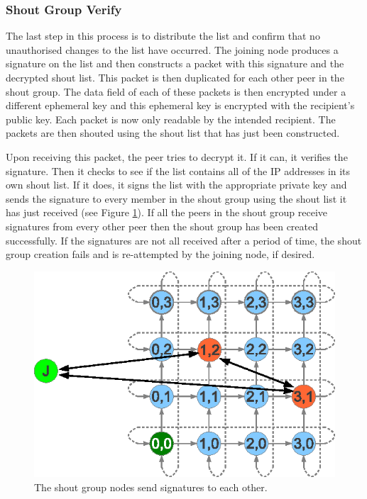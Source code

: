 \documentclass[ %
                    author={Luke Murray},
                supervisor={Dr. Simon Hollis},
                     title={Shadow Peer-to-Peer Networks},
                  subtitle={},
                    degree={MEng},
                      year={2013} ]{thesis}
\begin{document}
\subsubsection{Shout Group Verify}

The last step in this process is to distribute the list and confirm that no unauthorised changes to the list have occurred. The joining node produces a signature on the list and then constructs a packet with this signature and the decrypted shout list. This packet is then duplicated for each other peer in the shout group. The data field of each of these packets is then encrypted under a different ephemeral key and this ephemeral key is encrypted with the recipient's public key. Each packet is now only readable by the intended recipient. The packets are then shouted using the shout list that has just been constructed.

Upon receiving this packet, the peer tries to decrypt it. If it can, it verifies the signature. Then it checks to see if the list contains all of the IP addresses in its own shout list. If it does, it signs the list with the appropriate private key and sends the signature to every member in the shout group using the shout list it has just received (see Figure \ref{create_shout_group_verify}). If all the peers in the shout group receive signatures from every other peer then the shout group has been created successfully. If the signatures are not all received after a period of time, the shout group creation fails and is re-attempted by the joining node, if desired.

\begin{figure}[h]
    \centering
    \includegraphics{diagrams/create_shout_group_verify.eps}
    \caption{The shout group nodes send signatures to each other.}
    \label{create_shout_group_verify}
\end{figure}
\end{document}
